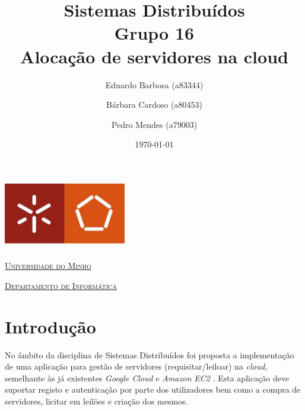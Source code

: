 \documentclass[a4paper]{article}
\begin{document}
\title{Sistemas Distribuídos\\ Grupo 16 \\ Alocação de servidores na cloud}
\author{Eduardo Barbosa (a83344) \and Bárbara Cardoso (a80453) \and Pedro Mendes (a79003)}
\date{\today}

\begin{titlepage}

    \thispagestyle{empty}
    \begin{center}
        \begin{minipage}{0.75\linewidth}
            \centering
            \includegraphics[width=0.4\textwidth]{eng.jpeg}\par\vspace{1cm}
            \vspace{1.5cm}
            \href{https://www.uminho.pt/PT}{\scshape\LARGE Universidade do Minho} \par
            \vspace{1cm}
            \href{https://www.di.uminho.pt/}{\scshape\Large Departamento de Informática} \par
            \vspace{1.5cm}

            \maketitle
        \end{minipage}
    \end{center}

\end{titlepage}

\tableofcontents

\pagebreak

\section{Introdução}
No âmbito da disciplina de Sistemas Distribuídos foi proposta a implementação de uma aplicação para gestão de servidores (requisitar/leiloar) na \textit{cloud}, semelhante às já existentes \textit{Google Cloud} e \textit{Amazon EC2} . Esta aplicação deve suportar registo e autenticação por parte dos utilizadores bem como a compra de servidores, licitar em leilões e criação dos mesmos.
\end{document}
